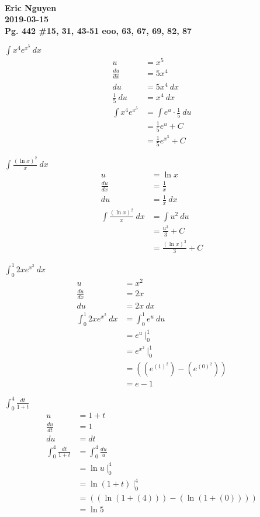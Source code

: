 \documentclass[12pt]{article}
\newenvironment{problem}[2][]{
    \begin{trivlist}
        \item[
            {\bfseries #1}
            {\bfseries #2.}
        ]
}{\end{trivlist}}
\newcommand{\assignment}{Pg. 442 \#15, 31, 43-51 eoo, 63, 67, 69, 82, 87}
\newcommand{\name}{Eric Nguyen}
\newcommand{\duedate}{2019-03-15}
\newcommand{\details}{\textbf{\\\name \\\duedate \\\assignment}}
\newcommand{\plugin}[2]{\left(\left({#1}\right) - \left({#2}\right)\right)}
\begin{document}
\details

\begin{problem}{15}
$\displaystyle\int x^4 e^{x^5} ~ dx$
\begin{align}
u &= x^5 \\
\frac{du}{dx} &= 5x^4 \\
du &= 5x^4 ~ dx \\
\frac{1}{5} ~ du &= x^4 ~ dx \\
\int x^4 e^{x^5} &= \int e^u \cdot \frac{1}{5} ~ du \\
&= \frac{1}{5} e^u + C \\
&= \frac{1}{5} e^{x^5} + C
\end{align}
\end{problem}

\begin{problem}{31}
$\displaystyle\int \frac{(\ln x)^2}{x} ~ dx$
\begin{align}
u &= \ln x \\
\frac{du}{dx} &= \frac{1}{x} \\
du &= \frac{1}{x} ~ dx \\
\int \frac{(\ln x)^2}{x} ~ dx &= \int u^2 ~ du \\
&= \frac{u^3}{3} + C \\
&= \frac{(\ln x)^3}{3} + C
\end{align}
\end{problem}

\begin{problem}{43}
$\displaystyle\int_0^1 2xe^{x^2} ~ dx$
\begin{align}
u &= x^2 \\
\frac{du}{dx} &= 2x \\
du &= 2x ~ dx \\
\int_0^1 2xe^{x^2} ~ dx &= \int_0^1 e^u ~ du \\
&= e^u ~ \bigg|_0^1 \\
&= e^{x^2} ~ \bigg|_0^1 \\
&= \plugin{e^{(1)^2}}{e^{(0)^2}} \\
&= e - 1
\end{align}
\end{problem}

\begin{problem}{47}
$\displaystyle\int_0^4 \frac{dt}{1 + t}$
\begin{align}
u &= 1 + t \\
\frac{du}{dt} &= 1 \\
du &= dt \\
\int_0^4 \frac{dt}{1 + t} &= \int_0^4 \frac{du}{u} \\
&= \ln u ~ \bigg|_0^4 \\
&= \ln{\left(1 + t\right)} ~ \bigg|_0^4 \\
&= \plugin{\ln{\left(1 + (4)\right)}}{\ln{\left(1 + (0)\right)}} \\
&= \ln 5
\end{align}
\end{problem}
\end{document}
